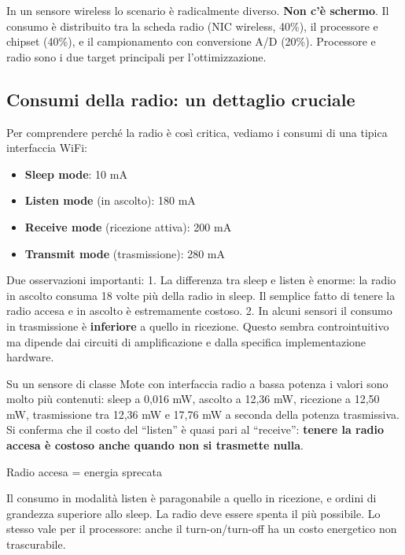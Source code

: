 \documentclass[
  italian,
  openany]{book}
\providecommand{\tightlist}{%
  \setlength{\itemsep}{0pt}\setlength{\parskip}{0pt}}
\begin{document}
In un sensore wireless lo scenario è radicalmente diverso. \textbf{Non
c'è schermo}. Il consumo è distribuito tra la scheda radio (NIC
wireless, 40\%), il processore e chipset (40\%), e il campionamento con
conversione A/D (20\%). Processore e radio sono i due target principali
per l'ottimizzazione.

\subsection{Consumi della radio: un dettaglio
cruciale}\label{consumi-della-radio-un-dettaglio-cruciale}

Per comprendere perché la radio è così critica, vediamo i consumi di una
tipica interfaccia WiFi:

\begin{itemize}
\tightlist
\item
  \textbf{Sleep mode}: 10 mA
\item
  \textbf{Listen mode} (in ascolto): 180 mA
\item
  \textbf{Receive mode} (ricezione attiva): 200 mA
\item
  \textbf{Transmit mode} (trasmissione): 280 mA
\end{itemize}

Due osservazioni importanti: 1. La differenza tra sleep e listen è
enorme: la radio in ascolto consuma 18 volte più della radio in sleep.
Il semplice fatto di tenere la radio accesa e in ascolto è estremamente
costoso. 2. In alcuni sensori il consumo in trasmissione è
\textbf{inferiore} a quello in ricezione. Questo sembra controintuitivo
ma dipende dai circuiti di amplificazione e dalla specifica
implementazione hardware.

Su un sensore di classe Mote con interfaccia radio a bassa potenza i
valori sono molto più contenuti: sleep a 0,016 mW, ascolto a 12,36 mW,
ricezione a 12,50 mW, trasmissione tra 12,36 mW e 17,76 mW a seconda
della potenza trasmissiva. Si conferma che il costo del ``listen'' è
quasi pari al ``receive'': \textbf{tenere la radio accesa è costoso
anche quando non si trasmette nulla}.

\begin{calloutwarning}{Radio accesa = energia sprecata}

Il consumo in modalità listen è paragonabile a quello in ricezione, e
ordini di grandezza superiore allo sleep. La radio deve essere spenta il
più possibile. Lo stesso vale per il processore: anche il
turn-on/turn-off ha un costo energetico non trascurabile.

\end{calloutwarning}
\end{document}
